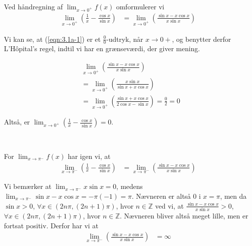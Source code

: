 \documentclass[11pt,a4paper]{article}
\newcommand{\limit}[2]{\lim_{#1 \rightarrow #2}}
\newcommand{\eqnref}[1]{(\ref{eqn:#1})}
\begin{document}
\begin{multicols}{2}

    \noindent
    Ved håndregning af $\limit{x}{0^+} f(x)$ omformulerer vi
    \begin{align}
        \limit{x}{0^+} \left( \frac{1}{x} - \frac{\cos x}{\sin x} \right)
        &= \limit{x}{0^+} \left( \frac{\sin x - x \cos x}{x \sin x} \right)
        \label{eqn:3.1a-1}
    \end{align}

    Vi kan se, at \eqnref{3.1a-1} er et $\frac{0}{0}$-udtryk, når $x
    \rightarrow 0+$, og benytter derfor L'Hôpital's regel, indtil vi har en
    grænseværdi, der giver mening.

    \begin{align}
        &\limit{x}{0^+} \left( \frac{\sin x - x \cos x}{x \sin x} \right) \\
        &= \limit{x}{0^+} \left( \frac{x \sin x}{\sin x + x \cos x} \right) \\
        &= \limit{x}{0^+} \left( \frac{\sin x + x \cos x}{2 \cos x - \sin x} \right)
         = \frac{0}{2} = 0
    \end{align}
    
    Altså, er $\limit{x}{0^+} \left( \frac{1}{x} - \frac{\cos x}{\sin x}
    \right) = 0$.
    
    \vfill{\ }\columnbreak

    \noindent
    For $\limit{x}{\pi^-} f(x)$ har igen vi, at
    \begin{align}
        \limit{x}{\pi^-} \left( \frac{1}{x} - \frac{\cos x}{\sin x} \right)
        &= \limit{x}{\pi^-} \left( \frac{\sin x - x \cos x}{x \sin x} \right)
    \end{align}
    
    Vi bemærker at $\limit{x}{\pi^-} x \sin x = 0$, medens $\limit{x}{\pi^-}
    \sin x - x \cos x = -\pi(-1) = \pi$. Nævneren er altså $0$ i $x = \pi$,
    men da $\sin x > 0$, $\forall x \in (2n\pi, (2n+1)\pi)$, hvor $n \in
    \mathbb{Z}$ ved vi, at $\frac{\sin x - x \cos x}{x \sin x} > 0$, $\forall
    x \in (2n\pi,(2n+1)\pi)$, hvor $n \in \mathbb{Z}$. Nævneren bliver altså
    meget lille, men er fortsat positiv. Derfor har vi at
    \begin{align}
        \limit{x}{\pi^-} \left( \frac{\sin x - x \cos x}{x \sin x} \right) &= \infty
    \end{align}
    \vfill{\ }

\end{multicols}
\end{document}
